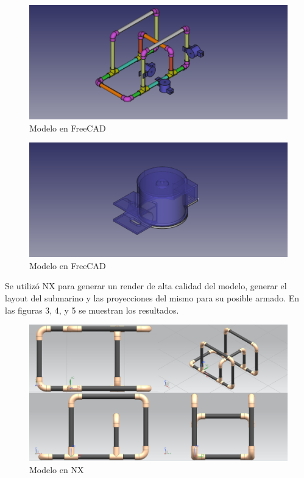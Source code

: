  \begin{figure}[!htbp]
 \centering
 \includegraphics [scale=0.5]
  {./img/seaperch_freecad.png}
  \caption{Modelo en FreeCAD}
 \end{figure}

 \begin{figure}[!htbp]
 \centering
 \includegraphics [scale=0.5]
  {./img/seaperch_motor.png}
  \caption{Modelo en FreeCAD}
 \end{figure}

Se utiliz\'o NX para generar un render de alta calidad del modelo, generar el layout del submarino y las proyecciones del mismo
para su posible armado. En las figuras 3, 4, y 5 se muestran los resultados.

 \begin{figure}[!htbp]
 \centering
 \includegraphics [scale=0.25]
  {./img/seaperch_nx.png}
  \caption{Modelo en NX}
 \end{figure}

